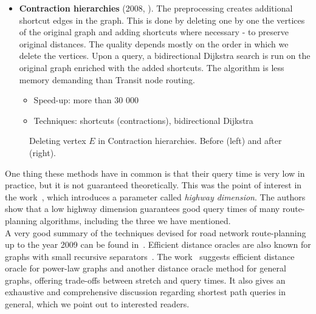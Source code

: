 \begin{itemize}
		\item \textbf{Contraction hierarchies} (2008, \cite{contracthier08}). The preprocessing creates additional shortcut edges in the graph. This is done by deleting one by one the vertices of the original graph and adding shortcuts where necessary - to preserve original distances. The quality depends mostly on the order in which we delete the vertices. Upon a query, a bidirectional Dijkstra search is run on the original graph enriched with the added shortcuts. The algorithm is less memory demanding than Transit node routing.
		\begin{itemize}
			\item Speed-up: more than 30 000
			\item Techniques: shortcuts (contractions), bidirectional Dijkstra
		\end{itemize}
	\end{itemize}
	\hspace{\fill}
	
	\begin{figure}[h!]
		\centering
	    \caption{\label{fig:contraction} Deleting vertex $E$ in Contraction hierarchies. Before (left) and after (right).}
		\end{figure}
	
	\noindent One thing these methods have in common is that their query time is very low in practice, but it is not guaranteed theoretically. This was the point of interest in the work~\cite{highwaydim10}, which introduces a parameter called \textit{highway dimension}. The authors show that a low highway dimension guarantees good query times of many route-planning algorithms, including the three we have mentioned. \\
	
	\noindent A very good summary of the techniques devised for road network route-planning up to the year 2009 can be found in~\cite{engineeringroute09}. Efficient distance oracles are also known for graphs with small recursive separators~\cite{distlabel04}. The work~\cite{sommerthesis10} suggests efficient distance oracle for power-law graphs and another distance oracle method for general graphs, offering trade-offs between stretch and query times. It also gives an exhaustive and comprehensive discussion regarding shortest path queries in general, which we point out to interested readers.
	
